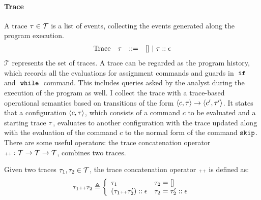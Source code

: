 \paragraph{Trace}
A trace $\mathtt{\tau} \in \mathcal{T} $ is a list of events, 
collecting the events generated along the program execution. 
\[
\begin{array}{llll}
\mbox{Trace} & \mathtt{\tau}
& ::= & [] ~|~ \mathtt{\tau} :: \mathtt{\epsilon}
\end{array}
\]
$\mathcal{T} $ represents the set of traces. 
A trace can be regarded as the program history, 
which records all the evaluations for assignment commands and guards in $\;\mathtt{if}\;$ and $\;\mathtt{while}\;$ command.
This includes queries asked by the analyst during the execution of the program as well. 
I collect the trace with a trace-based operational semantics based on transitions 
of the form $ \langle c, \mathtt{\tau} \rangle \to \langle c', \mathtt{\tau}' \rangle $. 
It states that a configuration $\langle c, \mathtt{\tau} \rangle$,
which consists of a command $c$ to be evaluated and a starting trace $\mathtt{\tau}$, 
evaluates to another configuration with the trace updated along with the evaluation of the command $c$ to the normal form of the command $\mathtt{skip}$.
%
\\
There are some useful operators: the trace concatenation operator ${\scriptscriptstyle ++}: \mathcal{T} \to \mathcal{T} \to \mathcal{T}$, combines two traces.
\begin{defn}
  Given two traces $\mathtt{\tau}_1, \mathtt{\tau}_2 \in \mathcal{T}$, the trace concatenation operator 
  ${\scriptscriptstyle ++}$ is defined as:
  \[
    \trace_1 \tracecat \trace_2 \triangleq
    \left\{
    \begin{array}{ll} 
       \trace_1 & \trace_2 = [] \\
       (\trace_1  \tracecat \trace_2')  :: \event & \trace_2 = \trace_2' :: \event
    \end{array}
    \right.
  \]
  \end{defn}
